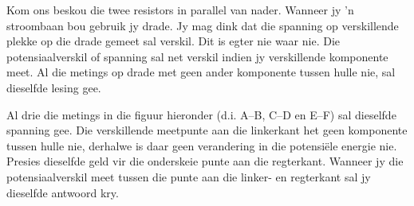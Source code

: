 Kom ons beskou die twee resistors in parallel van nader. Wanneer jy 'n
stroombaan bou gebruik jy drade. Jy mag dink dat die spanning op verskillende
plekke op die drade gemeet sal verskil. Dit is egter nie waar nie. Die
potensiaalverskil of spanning sal net verskil indien jy verskillende komponente
meet. Al die metings op drade met geen ander komponente tussen hulle nie, sal
dieselfde lesing gee.

Al drie die metings in die figuur hieronder (d.i. A--B, C--D en E--F) sal
dieselfde spanning gee. Die verskillende meetpunte aan die linkerkant het geen
komponente tussen hulle nie, derhalwe is daar geen verandering in die
potensi\"ele energie nie. Presies dieselfde geld vir die onderskeie punte aan
die regterkant. Wanneer jy die potensiaalverskil meet tussen die punte aan die
linker- en regterkant sal jy dieselfde antwoord kry.

